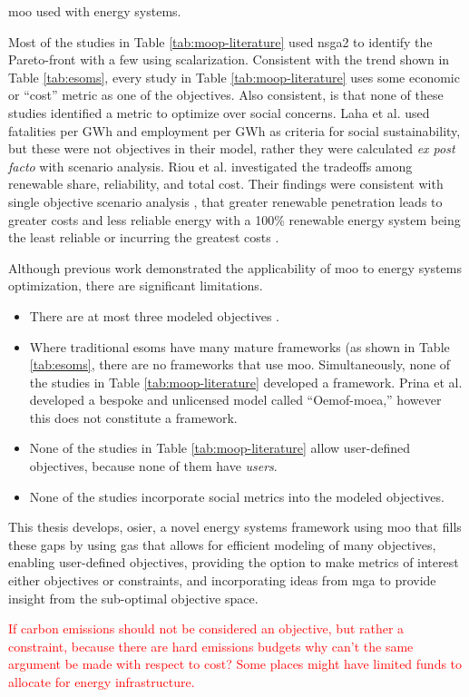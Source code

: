 \begin{table}[ht!]
    \centering
    \caption{\ac{moo} used with energy systems.}
    \label{tab:moop-literature}
    \resizebox*{\textwidth}{!}{}
\end{table}
Most of the studies in Table \ref{tab:moop-literature} used \ac{nsga2} to
identify the Pareto-front with a few using scalarization. Consistent with the
trend shown in Table \ref{tab:esoms}, every study in Table
\ref{tab:moop-literature} uses some economic or ``cost'' metric as one of the
objectives. Also consistent, is that none of these studies identified a metric
to optimize over social concerns. Laha et al. \cite{laha_low_2021} used
fatalities per GWh and employment per GWh as criteria for social sustainability,
but these were not objectives in their model, rather they were calculated
\textit{ex post facto} with scenario analysis. Riou et al.
\cite{riou_multi-objective_2021} investigated the tradeoffs among renewable
share, reliability, and total cost. Their findings were consistent with single
objective scenario analysis \cite{de_sisternes_value_2016}, that greater
renewable penetration leads to greater costs and less reliable energy with a
100\% renewable energy system being the least reliable or incurring the greatest
costs \cite{riou_multi-objective_2021}. 

Although previous work demonstrated the applicability of \ac{moo} to energy
systems optimization, there are significant limitations. 
\begin{itemize}
    \item{There are at most three modeled objectives
    \cite{riou_multi-objective_2021,de-leon_almaraz_deployment_2015,
    de-leon_almaraz_assessment_2013}.}
    \item{Where traditional \acp{esom} have many mature frameworks (as shown in
    Table \ref{tab:esoms}, there are no frameworks that use \ac{moo}.
    Simultaneously, none of the studies in Table \ref{tab:moop-literature}
    developed a framework. Prina et al. developed a bespoke and unlicensed model
    called ``Oemof-moea,'' however this does not constitute a framework.}
    \item{None of the studies in Table \ref{tab:moop-literature} allow
    user-defined objectives, because none of them have \textit{users}.}
    \item{None of the studies incorporate social metrics into the modeled objectives.}
\end{itemize}

This thesis develops, \ac{osier}, a novel energy systems framework using
\ac{moo} that fills these gaps by using \acp{ga} that allows for efficient
modeling of many objectives, enabling user-defined objectives, providing the
option to make metrics of interest either objectives or constraints, and
incorporating ideas from \ac{mga} to provide insight from the sub-optimal
objective space.


\textcolor{red}{If carbon emissions should not be considered an objective, but rather a constraint, because there are hard emissions budgets why can't the same argument be made with respect to cost? Some places might have limited funds to allocate for energy infrastructure. }